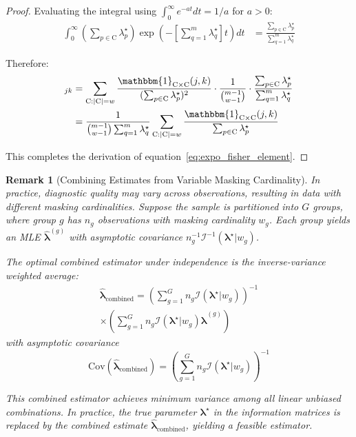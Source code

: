 \documentclass[pdflatex,sn-mathphys-num,Numbered]{sn-jnl}
\newcommand{\RV}[1]{\mathrm{#1}}
\newcommand{\cand}{\RV{C}}         %
\newcommand{\tparam}[1]{{#1}^{\star}}  %
\newcommand{\estimator}[1]{\hat{#1}}   %
\newcommand{\infomatrx}{\mathcal{I}}
\renewcommand{\vec}[1]{\boldsymbol{#1}}
\newcommand{\SetIndicator}[1]{\mathbbm{1}_{#1}}
\theoremstyle{thmstyleone}
\theoremstyle{thmstylethree}
\theoremstyle{thmstyletwo}
\newtheorem{remark}[theorem]{Remark}
\begin{document}
\begin{proof}
Evaluating the integral using $\int_0^\infty e^{-at} dt = 1/a$ for $a > 0$:
\begin{align}
\int_0^\infty \left(\sum_{p \in \cand} \tparam{\lambda}_p\right) \exp\left(-\left[\sum_{q=1}^{m} \tparam{\lambda}_q\right] t\right) dt &= \frac{\sum_{p \in \cand} \tparam{\lambda}_p}{\sum_{q=1}^{m} \tparam{\lambda}_q}
\end{align}

Therefore:
\begin{align}
[\infomatrx(\tparam{\vec{\lambda}} | w)]_{jk} &= \sum_{\cand: |\cand|=w} \frac{\SetIndicator{\cand \times \cand}(j,k)}{(\sum_{p \in \cand} \tparam{\lambda}_p)^2} \cdot \frac{1}{\binom{m-1}{w-1}} \cdot \frac{\sum_{p \in \cand} \tparam{\lambda}_p}{\sum_{q=1}^{m} \tparam{\lambda}_q} \nonumber\\
&= \frac{1}{\binom{m-1}{w-1} \sum_{q=1}^{m} \tparam{\lambda}_q} \sum_{\cand: |\cand|=w} \frac{\SetIndicator{\cand \times \cand}(j,k)}{\sum_{p \in \cand} \tparam{\lambda}_p}
\end{align}

This completes the derivation of equation~\eqref{eq:expo_fisher_element}.
\end{proof}

\begin{remark}[Combining Estimates from Variable Masking Cardinality]
\label{rem:variable_w}
In practice, diagnostic quality may vary across observations, resulting in data with different masking cardinalities. Suppose the sample is partitioned into $G$ groups, where group $g$ has $n_g$ observations with masking cardinality $w_g$. Each group yields an MLE $\estimator{\vec{\lambda}}^{(g)}$ with asymptotic covariance $n_g^{-1}\infomatrx^{-1}(\tparam{\vec{\lambda}} | w_g)$.

The optimal combined estimator under independence is the inverse-variance weighted average:
\begin{multline}
\label{eq:combined_mle}
\estimator{\vec{\lambda}}_{\text{combined}} = \left(\sum_{g=1}^{G} n_g \infomatrx(\tparam{\vec{\lambda}} | w_g)\right)^{-1} \\
 \times \left(\sum_{g=1}^{G} n_g \infomatrx(\tparam{\vec{\lambda}} | w_g) \estimator{\vec{\lambda}}^{(g)}\right)
\end{multline}
with asymptotic covariance
\begin{equation}
\label{eq:combined_cov}
\mathrm{Cov}(\estimator{\vec{\lambda}}_{\text{combined}}) = \left(\sum_{g=1}^{G} n_g \infomatrx(\tparam{\vec{\lambda}} | w_g)\right)^{-1}
\end{equation}

This combined estimator achieves minimum variance among all linear unbiased combinations. In practice, the true parameter $\tparam{\vec{\lambda}}$ in the information matrices is replaced by the combined estimate $\estimator{\vec{\lambda}}_{\text{combined}}$, yielding a feasible estimator.
\end{remark}
\end{document}
